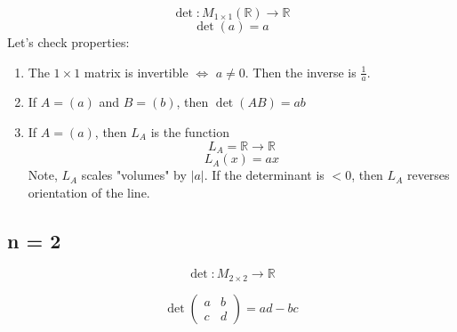 \documentclass{article}
\newtheorem{one minute paper}[theorem]{One Minute Paper}
\begin{document}
\begin{equation}
    \det: M_{1 \times 1}(\mathbb{R}) \rightarrow \mathbb{R}
\end{equation}
\begin{equation}
    \det(a) = a
\end{equation}
Let's check properties:
\begin{enumerate}
    \item The $1 \times 1$ matrix is invertible $\iff$ $a \neq 0$. Then the inverse is $\frac{1}{a}$. 
    \item If $A = (a)$ and $B = (b)$, then $\det(AB) = ab$
    \item If $A = (a)$, then $L_A$ is the function 
    \begin{equation}
        L_A = \mathbb{R} \rightarrow \mathbb{R}
    \end{equation} 
    \begin{equation}
        L_A(x) = ax
    \end{equation}
    Note, $L_A$ scales "volumes" by $|a|$. If the determinant is $< 0$, then $L_A$ reverses orientation of the line. 
\end{enumerate}

\subsection*{n = 2}

\begin{equation}
    \det: M_{2 \times 2} \rightarrow \mathbb{R}
\end{equation}

\begin{equation}
    \det\begin{pmatrix}
        a & b \\
        c & d
    \end{pmatrix} = ad - bc
\end{equation}
\end{document}
